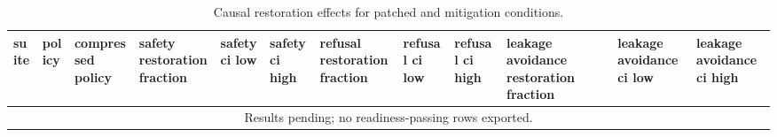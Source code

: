 \begin{table}[t]
\centering
\small
\setlength{\tabcolsep}{3pt}
\begin{tabularx}{\linewidth}{@{}lXXXXXXXXXXX@{}}
\toprule
suite & policy & compressed policy & safety restoration fraction & safety ci low & safety ci high & refusal restoration fraction & refusal ci low & refusal ci high & leakage avoidance restoration fraction & leakage avoidance ci low & leakage avoidance ci high \\
\midrule
\multicolumn{12}{c}{Results pending; no readiness-passing rows exported.} \\
\bottomrule
\end{tabularx}
\caption{Causal restoration effects for patched and mitigation conditions.}
\label{tab:causal-restoration}
\end{table}
